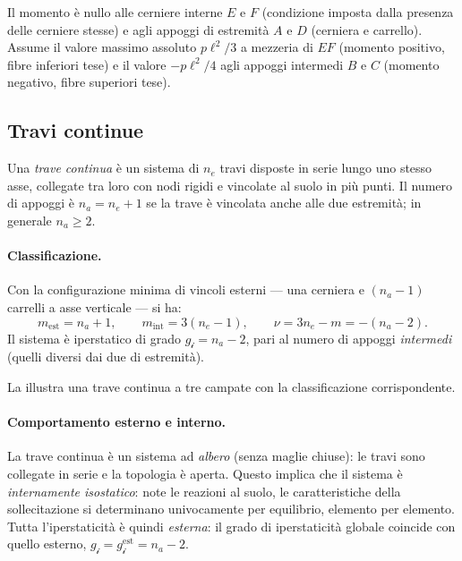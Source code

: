 Il momento è nullo alle cerniere interne $E$ e $F$
(condizione imposta dalla presenza delle cerniere stesse)
e agli appoggi di estremità $A$ e $D$ (cerniera e carrello).
Assume il valore massimo assoluto $p\ell^2/3$ a mezzeria
di $EF$ (momento positivo, fibre inferiori tese) e il
valore $-p\ell^2/4$ agli appoggi intermedi $B$ e $C$
(momento negativo, fibre superiori tese).


\subsection{Travi continue}
\label{subsec:travi_continue}

Una \emph{trave continua} è un sistema di $n_e$ travi
disposte in serie lungo uno stesso asse, collegate tra
loro con nodi rigidi e vincolate al suolo in più punti.
Il numero di appoggi è $n_a = n_e + 1$ se la trave è
vincolata anche alle due estremità; in generale
$n_a \geq 2$.

\paragraph{Classificazione.}
Con la configurazione minima di vincoli esterni ---
una cerniera e $(n_a - 1)$ carrelli a asse verticale
--- si ha:
\begin{equation}\label{eq:class_trave_continua}
m_{\text{est}} = n_a + 1, \qquad
m_{\text{int}} = 3(n_e - 1), \qquad
\nu = 3n_e - m = -(n_a - 2).
\end{equation}
Il sistema è iperstatico di grado $g_{\mathscr{i}} = n_a - 2$,
pari al numero di appoggi \emph{intermedi} (quelli diversi
dai due di estremità).

La  illustra una trave
continua a tre campate con la classificazione corrispondente.






\paragraph{Comportamento esterno e interno.}
La trave continua è un sistema ad \emph{albero} (senza
maglie chiuse): le travi sono collegate in serie e la
topologia è aperta. Questo implica che il sistema è
\emph{internamente isostatico}: note le reazioni al
suolo, le caratteristiche della sollecitazione si
determinano univocamente per equilibrio, elemento per
elemento. Tutta l'iperstaticità è quindi \emph{esterna}:
il grado di iperstaticità globale coincide con quello
esterno, $g_{\mathscr{i}} = g_{\mathscr{i}}^{\text{est}} = n_a - 2$.


